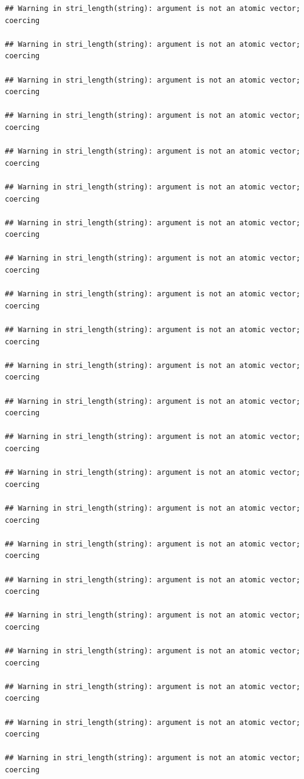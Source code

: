 \documentclass[
]{article}
\begin{document}
\begin{verbatim}
## Warning in stri_length(string): argument is not an atomic vector; coercing

## Warning in stri_length(string): argument is not an atomic vector; coercing

## Warning in stri_length(string): argument is not an atomic vector; coercing

## Warning in stri_length(string): argument is not an atomic vector; coercing

## Warning in stri_length(string): argument is not an atomic vector; coercing

## Warning in stri_length(string): argument is not an atomic vector; coercing

## Warning in stri_length(string): argument is not an atomic vector; coercing

## Warning in stri_length(string): argument is not an atomic vector; coercing

## Warning in stri_length(string): argument is not an atomic vector; coercing

## Warning in stri_length(string): argument is not an atomic vector; coercing

## Warning in stri_length(string): argument is not an atomic vector; coercing

## Warning in stri_length(string): argument is not an atomic vector; coercing

## Warning in stri_length(string): argument is not an atomic vector; coercing

## Warning in stri_length(string): argument is not an atomic vector; coercing

## Warning in stri_length(string): argument is not an atomic vector; coercing

## Warning in stri_length(string): argument is not an atomic vector; coercing

## Warning in stri_length(string): argument is not an atomic vector; coercing

## Warning in stri_length(string): argument is not an atomic vector; coercing

## Warning in stri_length(string): argument is not an atomic vector; coercing

## Warning in stri_length(string): argument is not an atomic vector; coercing

## Warning in stri_length(string): argument is not an atomic vector; coercing

## Warning in stri_length(string): argument is not an atomic vector; coercing


\end{verbatim}
\end{document}
